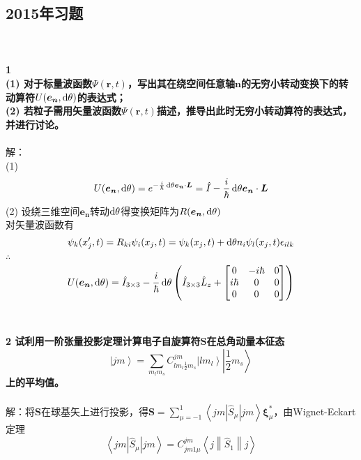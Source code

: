 \documentclass[12pt]{article}
\numberwithin{equation}{section}	 %
\begin{document}
\begin{spacing}{1.5}
\subsection{2015年习题}
~\\
~\\
\textbf{1 \\
(1) 对于标量波函数$\Psi(\bm{r},t)$，写出其在绕空间任意轴$\bm{n}$的无穷小转动变换下的转动算符$U(\bm{e_{n}},\mathop{}\!\mathrm{d}\theta)$的表达式；\\
(2) 若粒子需用矢量波函数$\Psi(\bm{r},t)$描述，推导出此时无穷小转动算符的表达式，并进行讨论。}\\
~\\
解：\\
(1) 
\begin{equation}
U(\bm{e_{n}},\mathop{}\!\mathrm{d}\theta) = e^{-\frac{i}{\hbar}\mathop{}\!\mathrm{d}\theta\bm{e_{n}}\cdot\bm{L}} = \hat{I}-\frac{i}{\hbar}\mathop{}\!\mathrm{d}\theta\bm{e_{n}}\cdot\bm{L}
\end{equation}
(2) 设绕三维空间$\bm{e_{n}}$转动$\mathop{}\!\mathrm{d}\theta$得变换矩阵为$R(\bm{e_{n}},\mathop{}\!\mathrm{d}\theta)$ \\
对矢量波函数有
\begin{equation}
\psi_{k}(x'_{j},t) = R_{ki}\psi_{i}(x_{j},t) = \psi_{k}(x_{j},t) + \mathop{}\!\mathrm{d}\theta n_{i}\psi_{l}(x_{j},t)\epsilon_{ilk}
\end{equation}
$\therefore$
\begin{equation}
U(\bm{e_{n}},\mathop{}\!\mathrm{d}\theta) = \hat{I}_{3\times3}-\frac{i}{\hbar}\mathop{}\!\mathrm{d}\theta\left(\hat{I}_{3\times3}\hat{L}_{z}+\begin{bmatrix} 0 & -i\hbar & 0 \\ i\hbar & 0 & 0 \\ 0 & 0 & 0 \end{bmatrix}\right)
\end{equation}
~\\
~\\
\textbf{2 \quad 试利用一阶张量投影定理计算电子自旋算符$\bm{S}$在总角动量本征态
\begin{equation}\nonumber 		%
\left|jm\right> = \sum_{m_{l}m_{s}}C^{jm}_{lm_{l}\frac{1}{2}m_{s}}\left|lm_{l}\right>\left|\frac{1}{2}m_{s}\right>
\end{equation}
上的平均值。}\\
~\\
解：将$\bm{S}$在球基矢上进行投影，得$\displaystyle \bm{S}=\sum^{1}_{\mu=-1}\left<jm\left|\hat{S}_{\mu}\right|jm\right>\bm\xi^{*}_{\mu}$，由Wignet-Eckart定理
\begin{equation}
\left<jm\left|\hat{S}_{\mu}\right|jm\right> = C^{jm}_{jm1\mu}\left<j\left\|\hat{S}_{1}\right\|j\right>

\end{equation}
\end{spacing}
\end{document}
